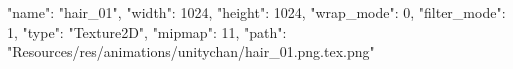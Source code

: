 {
  "name": "hair_01",
  "width": 1024,
  "height": 1024,
  "wrap_mode": 0,
  "filter_mode": 1,
  "type": "Texture2D",
  "mipmap": 11,
  "path": "Resources/res/animations/unitychan/hair_01.png.tex.png"
}